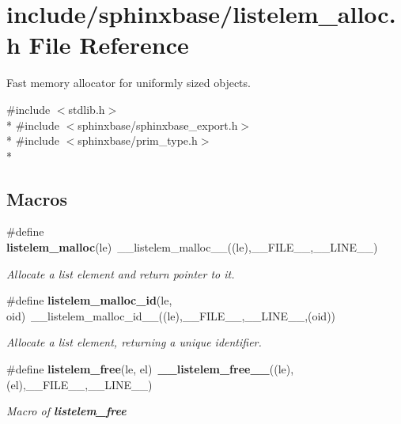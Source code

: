 \section{include/sphinxbase/listelem\+\_\+alloc.h File Reference}
\label{listelem__alloc_8h}


Fast memory allocator for uniformly sized objects.  


{\ttfamily \#include $<$stdlib.\+h$>$}\\*
{\ttfamily \#include $<$sphinxbase/sphinxbase\+\_\+export.\+h$>$}\\*
{\ttfamily \#include $<$sphinxbase/prim\+\_\+type.\+h$>$}\\*
\subsection*{Macros}
\begin{DoxyCompactItemize}
\item 
\#define {\bf listelem\+\_\+malloc}(le)~\+\_\+\+\_\+listelem\+\_\+malloc\+\_\+\+\_\+((le),\+\_\+\+\_\+\+F\+I\+L\+E\+\_\+\+\_\+,\+\_\+\+\_\+\+L\+I\+N\+E\+\_\+\+\_\+)\label{listelem__alloc_8h_ad0c40e65d9cca0d7ec08fcf416b09af2}

\begin{DoxyCompactList}\small\item\em Allocate a list element and return pointer to it. \end{DoxyCompactList}\item 
\#define {\bf listelem\+\_\+malloc\+\_\+id}(le,  oid)~\+\_\+\+\_\+listelem\+\_\+malloc\+\_\+id\+\_\+\+\_\+((le),\+\_\+\+\_\+\+F\+I\+L\+E\+\_\+\+\_\+,\+\_\+\+\_\+\+L\+I\+N\+E\+\_\+\+\_\+,(oid))\label{listelem__alloc_8h_aa9bbb7161aceacdba49b41b189554507}

\begin{DoxyCompactList}\small\item\em Allocate a list element, returning a unique identifier. \end{DoxyCompactList}\item 
\#define {\bf listelem\+\_\+free}(le,  el)~{\bf \+\_\+\+\_\+listelem\+\_\+free\+\_\+\+\_\+}((le),(el),\+\_\+\+\_\+\+F\+I\+L\+E\+\_\+\+\_\+,\+\_\+\+\_\+\+L\+I\+N\+E\+\_\+\+\_\+)\label{listelem__alloc_8h_a67de661d7ca552347fa6f03005e25d74}

\begin{DoxyCompactList}\small\item\em Macro of {\bfseries listelem\+\_\+free} \end{DoxyCompactList}\end{DoxyCompactItemize}
